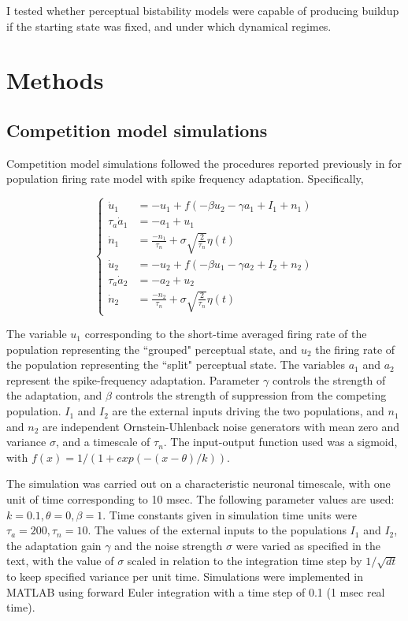 \documentclass[10pt]{article}
\begin{document}
I tested whether perceptual bistability models were capable of producing buildup if the starting state was fixed, and under which dynamical regimes.
\cite{Shpiro2009}

\section*{Methods}
\subsection*{Competition model simulations}
Competition model simulations followed the procedures reported previously in \cite{Shpiro2009} for population firing rate model with spike frequency adaptation. Specifically,

\begin{equation*}
	\begin{cases}
	\dot{u}_1 & = -u_1 +  f(-\beta u_2 - \gamma a_1 + I_1 + n_1) \\
	\tau_a \dot{a}_1 & = -a_1 + u_1\\
	\dot{n}_1 & = \frac{-n_1}{\tau_n} + \sigma \sqrt{\frac{2}{\tau_n}} \eta(t)\\
	\dot{u}_2 & = -u_2 +  f(-\beta u_1 - \gamma a_2 + I_2 + n_2) \\
	\tau_a \dot{a}_2 & = -a_2 + u_2\\
	\dot{n}_2 & = \frac{-n_2}{\tau_n } + \sigma \sqrt{\frac{2}{\tau_n}} \eta(t)
	
	\end{cases}
\end{equation*}

The variable $u_1$ corresponding to the short-time averaged firing rate of the population representing the ``grouped" perceptual state, and $u_2$ the firing rate of the population representing the ``split" perceptual state. The variables $a_1$ and $a_2$ represent the spike-frequency adaptation. Parameter $\gamma$ controls the strength of the adaptation, and $\beta$ controls the strength of suppression from the competing population. $I_1$ and $I_2$ are the external inputs driving the two populations, and $n_1$ and $n_2$ are independent Ornstein-Uhlenback noise generators with mean zero and variance $\sigma$, and a timescale of $\tau_n$. 
The input-output function used was a sigmoid, with $f (x) = 1/(1 + exp(−(x − \theta )/ k))$. 

The simulation was carried out on a characteristic neuronal timescale, with one unit of time corresponding to 10 msec. The following parameter values are used: $k = 0.1, \theta = 0, \beta = 1$. Time constants given in simulation time units were $\tau_a = 200, \tau_n = 10$. The values of the external inputs to the populations $I_1$ and $I_2$, the adaptation gain $\gamma$ and the noise strength $\sigma$ were varied as specified in the text, with the value of $\sigma$ scaled in relation to the integration time step by $1/\sqrt{dt}$ to keep specified variance per unit time. Simulations were implemented in MATLAB using forward Euler integration with a time step of 0.1 (1 msec real time).
\end{document}
